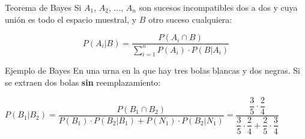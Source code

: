 \documentclass[11pt,handout]{beamer}
\begin{document}
\begin{frame}{Teorema de Bayes}
Si $A_1$, $A_2$, ..., $A_n$   son sucesos incompatibles dos a dos y cuya unión es todo el espacio muestral, y $B$ otro suceso cualquiera:
\begin{block}{}
$$P(A_i|B)=\dfrac{P(A_i \cap B)}{\sum_{i=1}^n P(A_i)\cdot  P(B|A_i)} $$
\end{block}
\end{frame}

\begin{frame}{Ejemplo de Bayes}
En una urna en la que hay tres bolas blancas y dos negras. Si se extraen dos bolas \textbf{sin} reemplazamiento:

\pause 
$P(B_1|B_2)=\dfrac{P(B_1 \cap B_2)}{P(B_1)\cdot  P(B_2|B_1)+P(N_1)\cdot  P(B_2|N_1)}=\dfrac{\dfrac{3}{5}\cdot\dfrac{2}{4}}{\dfrac{3}{5}\cdot\dfrac{2}{4} + \dfrac{2}{5}\cdot\dfrac{3}{4}}$
\end{frame}
\end{document}
